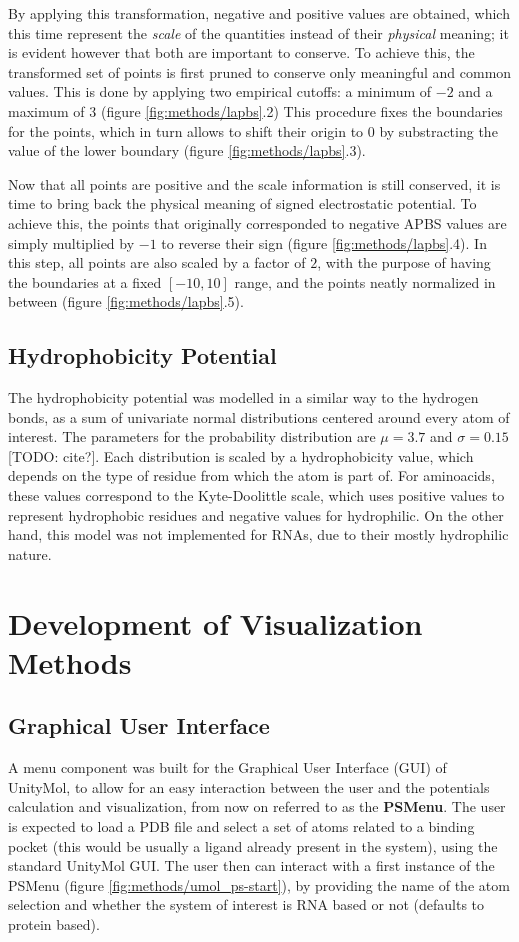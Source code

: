     By applying this transformation, negative and positive values are obtained, which this time represent the \textit{scale} of the quantities instead of their \textit{physical} meaning; it is evident however that both are important to conserve. To achieve this, the transformed set of points is first pruned to conserve only meaningful and common values. This is done by applying two empirical cutoffs: a minimum of $-2$ and a maximum of $3$ (figure \ref{fig:methods/lapbs}.2) This procedure fixes the boundaries for the points, which in turn allows to shift their origin to 0 by substracting the value of the lower boundary (figure \ref{fig:methods/lapbs}.3).

    Now that all points are positive and the scale information is still conserved, it is time to bring back the physical meaning of signed electrostatic potential. To achieve this, the points that originally corresponded to negative APBS values are simply multiplied by $-1$ to reverse their sign (figure \ref{fig:methods/lapbs}.4). In this step, all points are also scaled by a factor of $2$, with the purpose of having the boundaries at a fixed $[-10, 10]$ range, and the points neatly normalized in between (figure \ref{fig:methods/lapbs}.5).

  \subsection{Hydrophobicity Potential}
    The hydrophobicity potential was modelled in a similar way to the hydrogen bonds, as a sum of univariate normal distributions centered around every atom of interest. The parameters for the probability distribution are $\mu = 3.7$ and $\sigma = 0.15$ [TODO: cite?]. Each distribution is scaled by a hydrophobicity value, which depends on the type of residue from which the atom is part of. For aminoacids, these values correspond to the Kyte-Doolittle scale, which uses positive values to represent hydrophobic residues and negative values for hydrophilic. On the other hand, this model was not implemented for RNAs, due to their mostly hydrophilic nature.


\section{Development of Visualization Methods}
  \subsection{Graphical User Interface}
    A menu component was built for the Graphical User Interface (GUI) of UnityMol, to allow for an easy interaction between the user and the potentials calculation and visualization, from now on referred to as the \textbf{PSMenu}. The user is expected to load a PDB file and select a set of atoms related to a binding pocket (this would be usually a ligand already present in the system), using the standard UnityMol GUI. The user then can interact with a first instance of the PSMenu (figure \ref{fig:methods/umol_ps-start}), by providing the name of the atom selection and whether the system of interest is RNA based or not (defaults to protein based).

